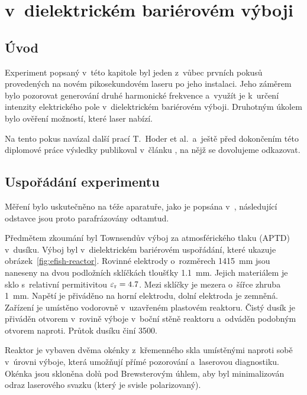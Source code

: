 \chapter[\EFISH]{{\EFISH} v~dielektrickém bariérovém výboji}

\newcommand\ypos{y}
\providecommand\efishmult{\alpha}
\providecommand\efishshift{P}

\section{Úvod}
\label{sec:efish-intro}
Experiment popsaný v~této kapitole byl jeden z~vůbec prvních pokusů
provedených na novém pikosekundovém laseru po jeho instalaci.
Jeho záměrem bylo pozorovat generování druhé harmonické frekvence
a~využít je k~určení intenzity elektrického pole v~dielektrickém
bariérovém výboji.
%
Druhotným úkolem bylo ověření možností, které laser nabízí.

Na tento pokus navázal další prací T.~Hoder et al.~a~ještě před dokončením
této diplomové práce výsledky publikoval v~článku \cite{efish-nitrogen},
na nějž se dovolujeme odkazovat.

\section{Uspořádání experimentu}
\label{sec:efish-setup}
Měření bylo uskutečněno na téže aparatuře, jako je popsána
v~\cite{efish-nitrogen},
následující odstavce jsou proto parafrázovány odtamtud.

Předmětem zkoumání byl Townsendův výboj za atmosférického tlaku (APTD)
v~dusíku.
Výboj byl v~dielektrickém bariérovém uspořádání, které ukazuje
obrázek~\ref{fig:efish-reactor}.
Rovinné elektrody o~rozměrech \num{14}\times\SI{15}{\milli\metre}
jsou naneseny na dvou podložních sklíčkách tloušťky \SI{1.1}{\milli\metre}.
Jejich materiálem je sklo s~relativní permitivitou ${\varepsilon_\text{r} = \num{4.7}}$.
Mezi sklíčky je mezera o~šířce zhruba \SI{1}{\milli\metre}.
\autocite{efish-nitrogen}
Napětí je přiváděno na horní elektrodu, dolní elektroda je zemněná.
Zařízení je umístěno vodorovně v~uzavřeném plastovém reaktoru.
Čistý dusík je přiváděn otvorem v~rovině výboje v~boční stěně reaktoru
a~odváděn podobným otvorem naproti.
Průtok dusíku činí \SI{3500}{\sccm}.

Reaktor je vybaven dvěma okénky z~křemenného skla umístěnými naproti
sobě v~úrovni výboje,
která umožňují přímé pozorování a~laserovou diagnostiku.
Okénka jsou skloněna dolů pod Brewsterovým úhlem, aby byl minimalizován
odraz laserového svazku (který je svisle polarizovaný).

